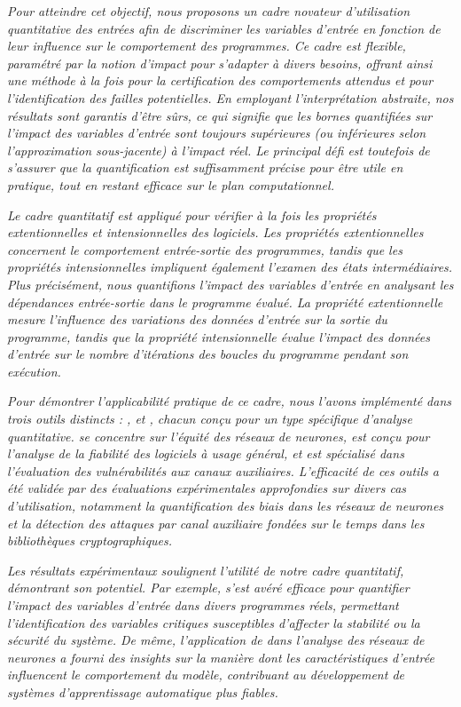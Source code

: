 \emph{Pour atteindre cet objectif, nous proposons un cadre novateur d'utilisation quantitative des entrées afin de discriminer les variables d'entrée en fonction de leur influence sur le comportement des programmes. Ce cadre est flexible, paramétré par la notion d'impact pour s'adapter à divers besoins, offrant ainsi une méthode à la fois pour la certification des comportements attendus et pour l'identification des failles potentielles. En employant l'interprétation abstraite, nos résultats sont garantis d'être sûrs, ce qui signifie que les bornes quantifiées sur l'impact des variables d'entrée sont toujours supérieures (ou inférieures selon l'approximation sous-jacente) à l'impact réel. Le principal défi est toutefois de s'assurer que la quantification est suffisamment précise pour être utile en pratique, tout en restant efficace sur le plan computationnel.}

\emph{Le cadre quantitatif est appliqué pour vérifier à la fois les propriétés extentionnelles et intensionnelles des logiciels. Les propriétés extentionnelles concernent le comportement entrée-sortie des programmes, tandis que les propriétés intensionnelles impliquent également l'examen des états intermédiaires. Plus précisément, nous quantifions l'impact des variables d'entrée en analysant les dépendances entrée-sortie dans le programme évalué. La propriété extentionnelle mesure l'influence des variations des données d'entrée sur la sortie du programme, tandis que la propriété intensionnelle évalue l'impact des données d'entrée sur le nombre d'itérations des boucles du programme pendant son exécution.}

\emph{Pour démontrer l'applicabilité pratique de ce cadre, nous l'avons implémenté dans trois outils distincts : \libra{}, \impatto{} et \timesec{}, chacun conçu pour un type spécifique d'analyse quantitative. \libra{} se concentre sur l'équité des réseaux de neurones, \impatto{} est conçu pour l'analyse de la fiabilité des logiciels à usage général, et \timesec{} est spécialisé dans l'évaluation des vulnérabilités aux canaux auxiliaires. L'efficacité de ces outils a été validée par des évaluations expérimentales approfondies sur divers cas d'utilisation, notamment la quantification des biais dans les réseaux de neurones et la détection des attaques par canal auxiliaire fondées sur le temps dans les bibliothèques cryptographiques.}

\emph{Les résultats expérimentaux soulignent l'utilité de notre cadre quantitatif, démontrant son potentiel. Par exemple, \timesec{} s'est avéré efficace pour quantifier l'impact des variables d'entrée dans divers programmes réels, permettant l'identification des variables critiques susceptibles d'affecter la stabilité ou la sécurité du système. De même, l'application de \libra{} dans l'analyse des réseaux de neurones a fourni des insights sur la manière dont les caractéristiques d'entrée influencent le comportement du modèle, contribuant au développement de systèmes d'apprentissage automatique plus fiables.}

